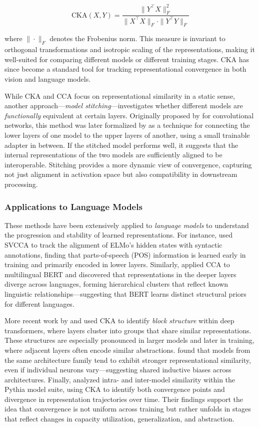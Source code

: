 \[
\mathrm{CKA}(X, Y) = \frac{\| Y^\top X \|_F^2}{\| X^\top X \|_F \cdot \| Y^\top Y \|_F}
\]

where \( \|\cdot\|_F \) denotes the Frobenius norm. This measure is invariant to orthogonal transformations and isotropic scaling of the representations, making it well-suited for comparing different models or different training stages. CKA has since become a standard tool for tracking representational convergence in both vision and language models.

While CKA and CCA focus on representational similarity in a static sense, another approach---\textit{model stitching}---investigates whether different models are \textit{functionally} equivalent at certain layers. Originally proposed by \citet{lenc2015understanding} for convolutional networks, this method was later formalized by \citet{bansal2021stitch} as a technique for connecting the lower layers of one model to the upper layers of another, using a small trainable adapter in between. If the stitched model performs well, it suggests that the internal representations of the two models are sufficiently aligned to be interoperable. Stitching provides a more dynamic view of convergence, capturing not just alignment in activation space but also compatibility in downstream processing.

\subsubsection{Applications to Language Models}

These methods have been extensively applied to \textit{language models} to understand the progression and stability of learned representations. For instance, \citet{saphra2019understanding} used SVCCA to track the alignment of ELMo's hidden states with syntactic annotations, finding that parts-of-speech (POS) information is learned early in training and primarily encoded in lower layers. Similarly, \citet{singh2019bert} applied CCA to multilingual BERT and discovered that representations in the deeper layers diverge across languages, forming hierarchical clusters that reflect known linguistic relationships---suggesting that BERT learns distinct structural priors for different languages.

More recent work by \citet{nguyen2020wide} and \citet{phang2021finetuned} used CKA to identify \textit{block structure} within deep transformers, where layers cluster into groups that share similar representations. These structures are especially pronounced in larger models and later in training, where adjacent layers often encode similar abstractions. \citet{wu2020similarity} found that models from the same architecture family tend to exhibit stronger representational similarity, even if individual neurons vary---suggesting shared inductive biases across architectures. Finally, \citet{brown2023understanding} analyzed intra- and inter-model similarity within the Pythia model suite, using CKA to identify both convergence points and divergence in representation trajectories over time. Their findings support the idea that convergence is not uniform across training but rather unfolds in stages that reflect changes in capacity utilization, generalization, and abstraction.

